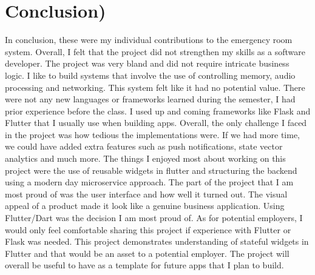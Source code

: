 \documentclass{article}
\begin{document}
\section{Conclusion)}
\begin{multicols}{2}
In conclusion, these were my individual contributions to the emergency room system. Overall, I felt that the project did not strengthen my skills as a software developer. The project was very bland and did not require intricate business logic. I like to build systems that involve the use of controlling memory, audio processing and networking. This system felt like it had no potential value. There were not any new languages or frameworks learned during the semester, I had prior experience before the class. I used up and coming frameworks like Flask and Flutter that I usually use when building apps. Overall, the only challenge I faced in the project was how tedious the implementations were. If we had more time, we could have added extra features such as push notifications, state vector analytics and much more. The things I enjoyed most about working on this project were the use of reusable widgets in flutter and structuring the backend using a modern day microservice approach. The part of the project that I am most proud of was the user interface and how well it turned out. The visual appeal of a product made it look like a genuine business application. Using Flutter/Dart was the decision I am most proud of. As for potential employers, I would only feel comfortable sharing this project if experience with Flutter or Flask was needed. This project demonstrates understanding of stateful widgets in Flutter and that would be an asset to a potential employer. The project will overall be useful to have as a template for future apps that I plan to build.

\end{multicols} 




 
\end{document}
